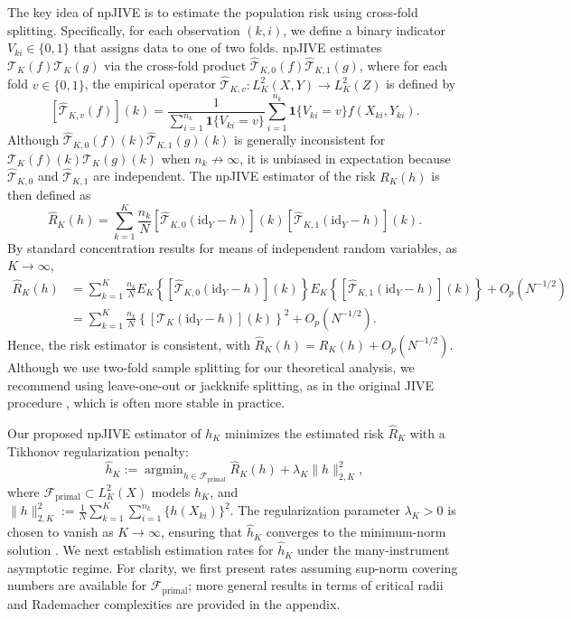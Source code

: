 \documentclass[11pt]{article}
\theoremstyle{plain}
\theoremstyle{definition}
\theoremstyle{remark}
\theoremstyle{definition}
\DeclareMathOperator*{\argmin}{argmin}
\begin{document}
The key idea of npJIVE is to estimate the population risk using cross-fold splitting. 
Specifically, for each observation \((k, i)\), we define a binary indicator \(V_{ki} \in \{0,1\}\) that assigns data to one of two folds. 
npJIVE estimates \(\mathcal{T}_K(f)\mathcal{T}_K(g)\) via the cross-fold product \(\widehat{\mathcal{T}}_{K,0}(f)\widehat{\mathcal{T}}_{K,1}(g)\), where for each fold \(v \in \{0,1\}\), the empirical operator \(\widehat{\mathcal{T}}_{K,v} : L^2_K(X, Y) \to L^2_K(Z)\) is defined by
\[
[\widehat{\mathcal{T}}_{K,v}(f)](k)
  = \frac{1}{\sum_{i=1}^{n_k} \mathbf{1}\{V_{ki} = v\}}
    \sum_{i=1}^{n_k} \mathbf{1}\{V_{ki} = v\} f(X_{ki}, Y_{ki}).
\]
Although \( \widehat{\mathcal{T}}_{K,0}(f)(k)\widehat{\mathcal{T}}_{K,1}(g)(k) \) is generally inconsistent for \( \mathcal{T}_K(f)(k)\mathcal{T}_K(g)(k) \) when \( n_k \not\to \infty \), it is unbiased in expectation because \(\widehat{\mathcal{T}}_{K,0}\) and \(\widehat{\mathcal{T}}_{K,1}\) are independent. 
The npJIVE estimator of the risk \(R_K(h)\) is then defined as
\[
\widehat{R}_{K}(h)
  = \sum_{k=1}^K \frac{n_k}{N}
    [\widehat{\mathcal{T}}_{K,0}(\mathrm{id}_Y - h)](k)
    [\widehat{\mathcal{T}}_{K,1}(\mathrm{id}_Y - h)](k).
\]
By standard concentration results for means of independent random variables, as \(K \to \infty\),
\begin{align*}
\widehat{R}_{K}(h)
  &= \sum_{k=1}^K \frac{n_k}{N}
     E_K\!\left\{[\widehat{\mathcal{T}}_{K,0}(\mathrm{id}_Y - h)](k)\right\}
     E_K\!\left\{[\widehat{\mathcal{T}}_{K,1}(\mathrm{id}_Y - h)](k)\right\}
     + O_p(N^{-1/2}) \\
  &= \sum_{k=1}^K \frac{n_k}{N}
     \left\{[\mathcal{T}_K(\mathrm{id}_Y - h)](k)\right\}^2
     + O_p(N^{-1/2}).
\end{align*}
Hence, the risk estimator is consistent, with \(\widehat{R}_{K}(h) = R_K(h) + O_p(N^{-1/2})\). Although we use two-fold sample splitting for our theoretical analysis, we recommend using leave-one-out or jackknife splitting, as in the original JIVE procedure \citep{angrist1999jackknife}, which is often more stable in practice.

Our proposed npJIVE estimator of \(h_K\) minimizes the estimated risk \(\widehat{R}_{K}\) with a Tikhonov regularization penalty:
\[
\widehat{h}_K := \argmin_{h \in \mathcal{F}_{\mathrm{primal}}} 
  \widehat{R}_{K}(h) + \lambda_K \|h\|^2_{2,K},
\]
where \(\mathcal{F}_{\mathrm{primal}} \subset L^2_K(X)\) models \(h_K\), and 
\(\|h\|^2_{2,K} := \frac{1}{N} \sum_{k=1}^K \sum_{i=1}^{n_k} \{h(X_{ki})\}^2\). 
The regularization parameter \(\lambda_K > 0\) is chosen to vanish as \(K \to \infty\), ensuring that \(\widehat{h}_K\) converges to the minimum-norm solution \citep{engl2015regularization}. 
We next establish estimation rates for \(\widehat{h}_K\) under the many-instrument asymptotic regime. 
For clarity, we first present rates assuming sup-norm covering numbers are available for \(\mathcal{F}_{\mathrm{primal}}\); 
more general results in terms of critical radii and Rademacher complexities are provided in the appendix.
\end{document}
